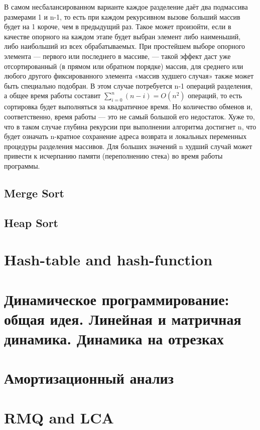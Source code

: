 \documentclass[a4paper]{article}
\begin{document}
\begin{itemize}
В самом несбалансированном варианте каждое разделение даёт два подмассива размерами 1 и n-1, то есть при каждом рекурсивном вызове больший массив будет на 1 короче, чем в предыдущий раз. Такое может произойти, если в качестве опорного на каждом этапе будет выбран элемент либо наименьший, либо наибольший из всех обрабатываемых. При простейшем выборе опорного элемента — первого или последнего в массиве, — такой эффект даст уже отсортированный (в прямом или обратном порядке) массив, для среднего или любого другого фиксированного элемента «массив худшего случая» также может быть специально подобран. В этом случае потребуется n-1 операций разделения, а общее время работы составит $\sum_{i=0}^n (n-i) = O(n^2)$ операций, то есть сортировка будет выполняться за квадратичное время. Но количество обменов и, соответственно, время работы — это не самый большой его недостаток. Хуже то, что в таком случае глубина рекурсии при выполнении алгоритма достигнет n, что будет означать n-кратное сохранение адреса возврата и локальных переменных процедуры разделения массивов. Для больших значений n худший случай может привести к исчерпанию памяти (переполнению стека) во время работы программы.

\end{itemize}


\subsection{Merge Sort}
\subsection{Heap Sort}

\section{Hash-table and hash-function}

\section{Динамическое программирование: общая идея. Линейная и матричная динамика. Динамика на отрезках}

\section{Амортизационный анализ}

\section{RMQ and LCA}
\end{document}
